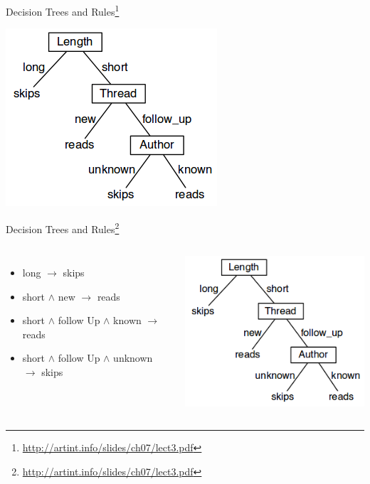 \documentclass{beamer}
\newcommand{\furl}[1]{{\footnote{\url{#1}}}}
\begin{document}
\begin{frame}{Decision Trees and Rules\furl{http://artint.info/slides/ch07/lect3.pdf}}
    \begin{center}
        \includegraphics[scale=0.50]{egDTrees.png}
    \end{center}
\end{frame}
\begin{frame}{Decision Trees and Rules\furl{http://artint.info/slides/ch07/lect3.pdf}}
    \begin{columns}
            \begin{itemize}
                \item long $\rightarrow$ skips
                \item short $\wedge$ new $\rightarrow$ reads 
                \item short $\wedge$ follow Up $\wedge$ known $\rightarrow$ reads 
                \item short $\wedge$ follow Up $\wedge$ unknown $\rightarrow$ skips 
            \end{itemize}
            
            \centering
            \includegraphics[scale=0.40]{egDTrees.png}
    \end{columns}
\end{frame}
\end{document}
